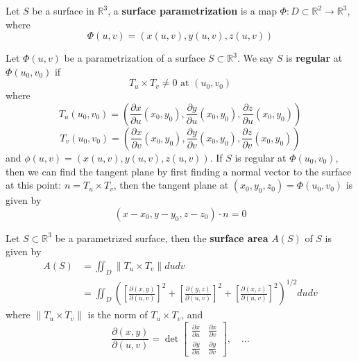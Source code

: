 \documentclass[openany]{book}
\newcommand{\R}{\mathbb{R}}
\begin{document}
\begin{defn}
    Let $S$ be a surface in $\R^3$, a \textbf{surface parametrization} is a map $\Phi:D\subset\R^2\to\R^3$, where 
    \begin{equation*}
        \Phi(u,v)=(x(u,v), y(u,v), z(u,v))
    \end{equation*}
\end{defn}


\begin{defn}
    Let $\Phi(u,v)$ be a parametrization of a surface $S\subset\R^3$.
    We say $S$ is \textbf{regular} at $\Phi(u_0,v_0)$ if 
    \begin{equation*}
        T_u\times T_v\neq 0 \text{ at } (u_0,v_0)
    \end{equation*}
    where 
    \begin{equation*}
        T_u(u_0,v_0)=\left(\frac{\partial x}{\partial u}(x_0,y_0), \frac{\partial y}{\partial u}(x_0,y_0), \frac{\partial z}{\partial u}(x_0,y_0)\right)
    \end{equation*}
    \begin{equation*}
        T_v(u_0,v_0)=\left(\frac{\partial x}{\partial v}(x_0,y_0), \frac{\partial y}{\partial v}(x_0,y_0), \frac{\partial z}{\partial v}(x_0,y_0)\right)
    \end{equation*}
    and $\phi(u,v)=(x(u,v), y(u,v), z(u,v))$.
    If $S$ is regular at $\Phi(u_0,v_0)$, then we can find the tangent plane by first finding a normal vector to the surface at this point: $n=T_u\times T_v$, then the tangent plane at $(x_0, y_0, z_0)=\Phi(u_0, v_0)$ is given by 
    \begin{equation*}
        (x-x_0, y-y_0, z-z_0)\cdot n=0
    \end{equation*}
\end{defn}

\begin{defn}
    Let $S\subset\R^3$ be a parametrized surface, then the \textbf{surface area} $A(S)$ of $S$ is given by 
    \begin{align*}
        A(S)&=\iint_D\|T_u\times T_v\|dudv\\
        &=\iint_D\left(\left[\frac{\partial(x,y)}{\partial(u,v)}\right]^2+\left[\frac{\partial(y,z)}{\partial(u,v)}\right]^2+\left[\frac{\partial(x,z)}{\partial(u,v)}\right]^2\right)^{1/2}dudv
    \end{align*}
    where $\|T_u\times T_v\|$ is the norm of $T_u\times T_v$, and 
    \begin{equation*}
        \frac{\partial(x,y)}{\partial(u,v)}=\det\begin{bmatrix}
            \frac{\partial x}{\partial u}&\frac{\partial x}{\partial v}\\
            \frac{\partial y}{\partial u}&\frac{\partial y}{\partial v}
        \end{bmatrix}, \quad \dots
    \end{equation*}
\end{defn}
\end{document}
